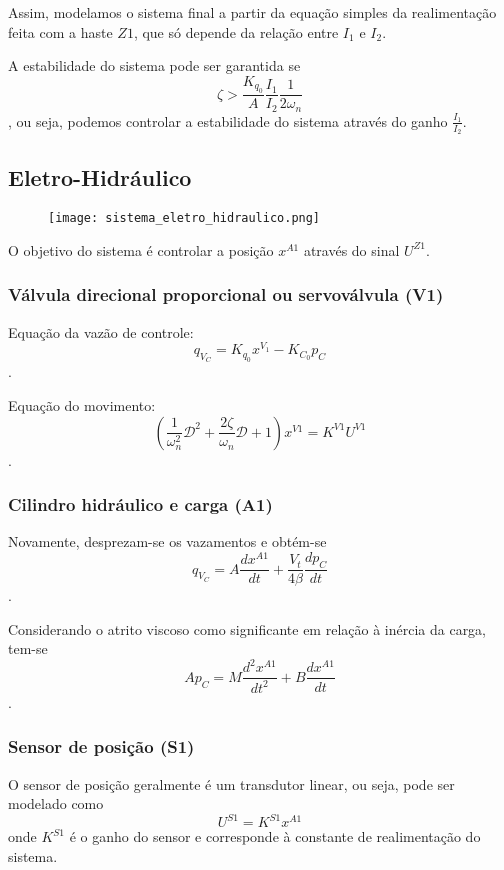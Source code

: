 \documentclass[a4paper]{report}
\begin{document}
Assim, modelamos o sistema final a partir da equação simples da realimentação feita com a haste $Z1$, que só depende da relação entre $I_1$ e $I_2$.

A estabilidade do sistema pode ser garantida se \[
\zeta > \frac{K_{q_0}}{A}\frac{I_1}{I_2}\frac{1}{2\omega_n}
\], ou seja, podemos controlar a estabilidade do sistema através do ganho $\frac{I_1}{I_2}$.

\subsection*{Eletro-Hidráulico}

\begin{figure}[H]
    \centering
    \texttt{[image: sistema\_eletro\_hidraulico.png]}
\end{figure}

O objetivo do sistema é controlar a posição $x^{A1}$ através do sinal $U^{Z1}$.

\subsubsection*{Válvula direcional proporcional ou servoválvula (V1)}

Equação da vazão de controle: \[
q_{V_C} = K_{q_0}x^{V_1} - K_{C_0}p_C
\].

Equação do movimento: \[
\left( \frac{1}{\omega_n^2}\mathcal{D}^2 + \frac{2\zeta}{\omega_n}\mathcal{D} + 1 \right) x^{V1} = K^{V 1}U^{V 1}
\].

\subsubsection*{Cilindro hidráulico e carga (A1)}

Novamente, desprezam-se os vazamentos e obtém-se \[
q_{V_C} = A \frac{dx^{A 1}}{dt} + \frac{V_t}{4\beta} \frac{d p_C}{dt}
\].

Considerando o atrito viscoso como significante em relação à inércia da carga, tem-se \[
    Ap_C = M \frac{d^2x^{A 1}}{dt^2} + B \frac{d x^{A 1}}{dt}
\].

\subsubsection*{Sensor de posição (S1)}

O sensor de posição geralmente é um transdutor linear, ou seja, pode ser modelado como \[
U^{S 1} = K^{S 1}x^{A 1}
\] onde $K^{S 1}$ é o ganho do sensor e corresponde à constante de realimentação do sistema.
\end{document}
